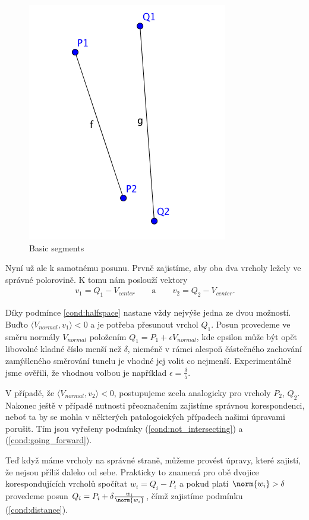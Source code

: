 \begin{figure}[ht]
    \centering
    \includegraphics{img/segments_basic.png}
    \caption{Basic segments}
  \centering
  \label{fig:segments_basic}
\end{figure}

Nyní už ale k samotnému posunu. Prvně zajistíme, aby oba dva vrcholy ležely ve
správné polorovině. K tomu nám poslouží vektory
\begin{align*}
    v_1 = Q_1 - V_{center} \qquad\text{a}\qquad v_2 = Q_2 - V_{center}.
\end{align*}

Díky podmínce \ref{cond:halfspace} nastane vždy nejvýše jedna
ze dvou možností. Buďto $ \langle V_{normal}, v_1\rangle < 0 $ a je potřeba
přesunout vrchol $ Q_1 $. Posun provedeme ve směru normály $ V_{normal} $ položením
$ Q_1 = P_1 + \epsilon V_{normal} $, kde epsilon může být opět libovolné
kladné číslo menší než $ \delta $, nicméně v rámci alespoň částečného zachování
zamýšleného směrování tunelu je vhodné jej volit co nejmenší. Experimentálně
jsme ověřili, že vhodnou volbou je například $ \epsilon = \frac{\delta}{5} $.

V případě, že $ \langle V_{normal}, v_2\rangle < 0 $, postupujeme zcela analogicky
pro vrcholy $ P_2 $, $ Q_2 $. Nakonec ještě v případě nutnosti přeoznačením
zajistíme správnou korespondenci, neboť ta by se mohla v některých patalogoických
případech našimi úpravami porušit. Tím jsou vyřešeny podmínky
(\ref{cond:not_intersecting}) a (\ref{cond:going_forward}).

Teď když máme vrcholy na správné straně, můžeme provést úpravy, které zajistí,
že nejsou příliš daleko od sebe. Prakticky to znamená pro obě dvojice
korespondujících vrcholů spočítat $ w_i = Q_i - P_i $ a pokud platí
$ \norm{w_i} > \delta $ provedeme posun
$ Q_i = P_i + \delta \frac{w_i}{\norm{w_i}} $, čímž zajistíme podmínku
(\ref{cond:distance}).

